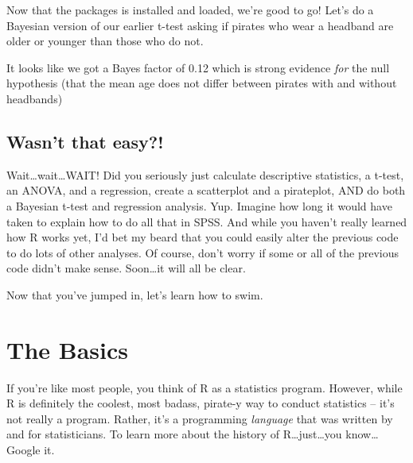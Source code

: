\documentclass[]{book}
\newenvironment{Shaded}{\begin{snugshade}}{\end{snugshade}}
\newcommand{\KeywordTok}[1]{\textcolor[rgb]{0.13,0.29,0.53}{\textbf{{#1}}}}
\newcommand{\DataTypeTok}[1]{\textcolor[rgb]{0.13,0.29,0.53}{{#1}}}
\newcommand{\StringTok}[1]{\textcolor[rgb]{0.31,0.60,0.02}{{#1}}}
\newcommand{\CommentTok}[1]{\textcolor[rgb]{0.56,0.35,0.01}{\textit{{#1}}}}
\newcommand{\NormalTok}[1]{{#1}}
\theoremstyle{definition}
\theoremstyle{definition}
\theoremstyle{remark}
\begin{document}
Now that the packages is installed and loaded, we're good to go! Let's
do a Bayesian version of our earlier t-test asking if pirates who wear a
headband are older or younger than those who do not.

\begin{Shaded}
\end{Shaded}

It looks like we got a Bayes factor of 0.12 which is strong evidence
\emph{for} the null hypothesis (that the mean age does not differ
between pirates with and without headbands)

\section{Wasn't that easy?!}\label{wasnt-that-easy}

Wait\ldots{}wait\ldots{}WAIT! Did you seriously just calculate
descriptive statistics, a t-test, an ANOVA, and a regression, create a
scatterplot and a pirateplot, AND do both a Bayesian t-test and
regression analysis. Yup. Imagine how long it would have taken to
explain how to do all that in SPSS. And while you haven't really learned
how R works yet, I'd bet my beard that you could easily alter the
previous code to do lots of other analyses. Of course, don't worry if
some or all of the previous code didn't make sense. Soon\ldots{}it will
all be clear.

Now that you've jumped in, let's learn how to swim.

\chapter{The Basics}\label{basics}

If you're like most people, you think of R as a statistics program.
However, while R is definitely the coolest, most badass, pirate-y way to
conduct statistics -- it's not really a program. Rather, it's a
programming \textit{language} that was written by and for statisticians.
To learn more about the history of R\ldots{}just\ldots{}you
know\ldots{}Google it.
\end{document}
